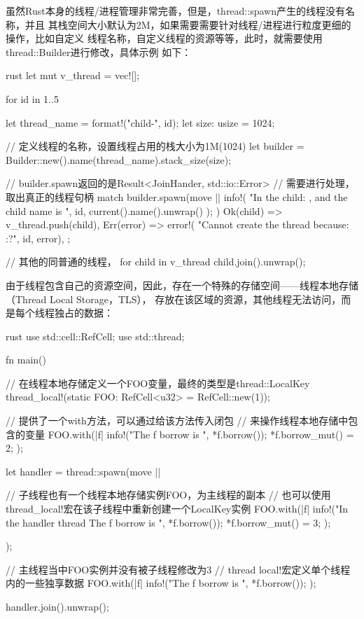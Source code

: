 虽然Rust本身的线程/进程管理非常完善，但是，thread::spawn产生的线程没有名称，并且
其栈空间大小默认为2M，如果需要需要针对线程/进程进行粒度更细的操作，比如自定义
线程名称，自定义线程的资源等等，此时，就需要使用thread::Builder进行修改，具体示例
如下：
\begin{code-block}{rust}
let mut v_thread = vec![];

for id in 1..5 {
    let thread_name = format!("child-{}", id);
    let size: usize = 1024;

    // 定义线程的名称，设置线程占用的栈大小为1M(1024)
    let builder = Builder::new().name(thread_name).stack_size(size);

    // builder.spawn返回的是Result<JoinHander, std::io::Error>
    // 需要进行处理，取出真正的线程句柄
    match builder.spawn(move || {
        info!(
            "In the child: {}, and the child name is {}",
            id,
            current().name().unwrap()
        );
    }) {
        Ok(child) => v_thread.push(child),
        Err(error) => error!(
            "Cannot create the thread {} because: {:?}", id, error),
    };
}

// 其他的同普通的线程，
for child in v_thread {
    child.join().unwrap();
}

\end{code-block}

由于线程包含自己的资源空间，因此，存在一个特殊的存储空间——线程本地存储（Thread Local Storage，TLS），
存放在该区域的资源，其他线程无法访问，而是每个线程独占的数据：
\begin{code-block}{rust}
use std::cell::RefCell;
use std::thread;

fn main() {
    // 在线程本地存储定义一个FOO变量，最终的类型是thread::LocalKey
    thread_local!(static FOO: RefCell<u32> = RefCell::new(1));

    // 提供了一个with方法，可以通过给该方法传入闭包
    // 来操作线程本地存储中包含的变量
    FOO.with(|f| {
        info!("The f borrow is {}", *f.borrow());
        *f.borrow_mut() = 2;
    });

    let handler = thread::spawn(move || {

        // 子线程也有一个线程本地存储实例FOO，为主线程的副本
        // 也可以使用thread_local!宏在该子线程中重新创建一个LocalKey实例
        FOO.with(|f| {
            info!("In the handler thread The f borrow is {}", *f.borrow());
            *f.borrow_mut() = 3;
        });
    });

    // 主线程当中FOO实例并没有被子线程修改为3
    // thread local!宏定义单个线程内的一些独享数据
    FOO.with(|f| {
        info!("The f borrow is {}", *f.borrow());
    });

    handler.join().unwrap();
}
\end{code-block}


